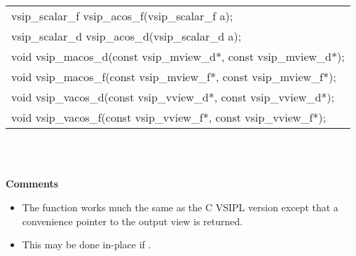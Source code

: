 \\\cvsiplh
\afh
\\\hspace*{.04\textwidth} {
\ttfamily
\begin{tabular}[H]{l}
vsip\_scalar\_f vsip\_acos\_f(vsip\_scalar\_f a);\\
vsip\_scalar\_d vsip\_acos\_d(vsip\_scalar\_d a);\\
void vsip\_macos\_d(const vsip\_mview\_d*, const vsip\_mview\_d*);\\
void vsip\_macos\_f(const vsip\_mview\_f*, const vsip\_mview\_f*);\\
void vsip\_vacos\_d(const vsip\_vview\_d*, const vsip\_vview\_d*);\\
void vsip\_vacos\_f(const vsip\_vview\_f*, const vsip\_vview\_f*);\\
\end{tabular}
}
\\\pyjvsiph
{}
\\\begin{minipage}{\textwidth}
\hspace*{.04\textwidth}\textbf{Comments}\\ 
\hspace*{.04\textwidth}\parbox{.95\textwidth}
{\vspace*{.1cm}
\begin{itemize}
\item{The  function works much the same as the C VSIPL version except that a convenience pointer to the output view is returned.}
\item{This may be done in-place if .}
\end{itemize}
}
\end{minipage}